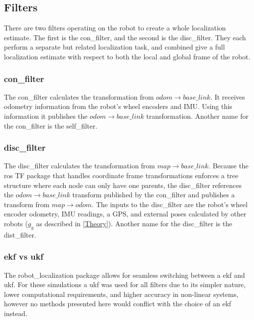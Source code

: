 \documentclass[thesis.tex]{subfile}
\begin{document}
\subsection{Filters}
There are two filters operating on the robot to create a whole localization estimate. The first is the \gls{con_filter}, and the second is the \gls{disc_filter}. They each perform a separate but related localization task, and combined give a full localization estimate with respect to both the local and global frame of the robot. 

\subsubsection{\gls{con_filter}} \label{con_filter_subsubsection}
The \gls{con_filter} calculates the transformation from $odom \rightarrow base\_link$. It receives odometry information from the robot's wheel encoders and IMU. Using this information it publishes the $odom \rightarrow base\_link$ transformation. Another name for the \gls{con_filter} is the \gls{self_filter}.  

\subsubsection{\gls{disc_filter}} \label{disc_filter_subsubsection}
The \gls{disc_filter} calculates the transformation from $map \rightarrow base\_link$. Because the \gls{ros} TF package that handles coordinate frame transformations enforces a tree structure where each node can only have one parents, the \gls{disc_filter} references the $odom \rightarrow base\_link$ transform published by the \gls{con_filter} and publishes a transform from $map \rightarrow odom$. The inputs to the \gls{disc_filter} are the robot's wheel encoder odometry, IMU readings, a GPS, and external poses calculated by other robots ($g_g$ as described in \autoref{Theory}). Another name for the \gls{disc_filter} is the \gls{dist_filter}.

\subsubsection{\gls{ekf} vs \gls{ukf}}
The robot\_localization package allows for seamless switching between a \gls{ekf} and \gls{ukf}. For these simulations a \gls{ukf} was used for all filters due to its simpler nature, lower computational requirements, and higher accuracy in non-linear systems, however no methods presented here would conflict with the choice of an \gls{ekf} instead.
 
\end{document}
